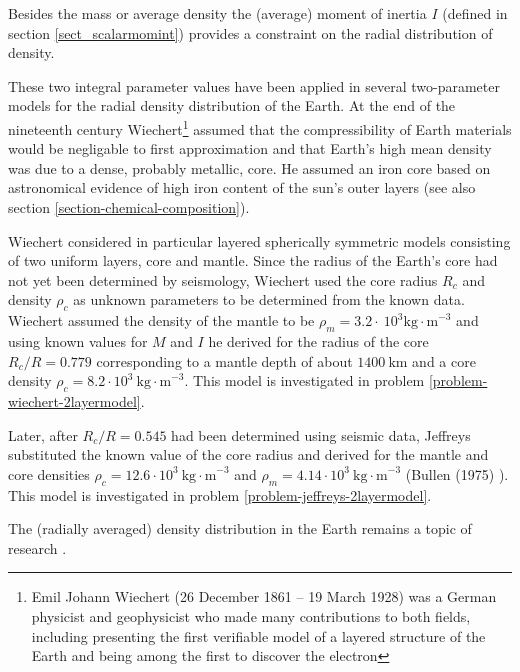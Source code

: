 Besides the mass or average density the (average) 
moment of inertia $I$ (defined in section \ref{sect_scalarmomint}) 
provides a constraint on the radial distribution of density.
     
These two integral parameter values have been applied in several 
two-parameter models for the radial density distribution of the Earth.
At the end of the nineteenth century Wiechert\footnote{Emil Johann 
Wiechert (26 December 1861 – 19 March 1928) was a German physicist 
and geophysicist who made many contributions to both fields, 
including presenting the first verifiable model of a layered structure of the 
Earth and being among the first to discover the electron} assumed that the 
compressibility of Earth materials would be negligable to first
approximation and that Earth's high mean density was due to a dense,
probably metallic, core.
He assumed an iron core based on astronomical evidence of high iron
content of the sun's outer layers 
(see also section \ref{section-chemical-composition}).

Wiechert considered in particular layered spherically symmetric 
models consisting of two uniform layers, core and mantle.
Since the radius of the Earth's core had not yet been determined by
seismology, Wiechert used the core radius $R_c$ and density 
$\rho_c$ as unknown parameters to be determined from the
known data.
Wiechert assumed the density of the mantle to be 
$\rho_m=3.2 \cdot~10^3 \mathrm{kg\cdot m}^{-3}$ and using known values for $M$ and $I$
he derived for the radius of the core
$R_c/R = 0.779$ corresponding to a mantle depth of about
$1400~\mathrm{km}$ and a core density 
$\rho_c=8.2\cdot 10^3~\mathrm{kg\cdot m}^{-3}$.
This model is investigated in problem 
\ref{problem-wiechert-2layermodel}.

Later, after $R_c/R = 0.545$ had been determined using
seismic data, Jeffreys substituted the known value of the
core radius and derived for the mantle and core densities
$\rho_c=12.6\cdot 10^3~ \mathrm{kg\cdot m}^{-3}$ and 
$\rho_m=4.14\cdot 10^3~ \mathrm{kg\cdot m}^{-3}$ (Bullen (1975) \cite{bull75}).
This model is investigated in problem 
\ref{problem-jeffreys-2layermodel}.

The (radially averaged) density distribution in the Earth remains a topic of research
\cite{kenn98}.

